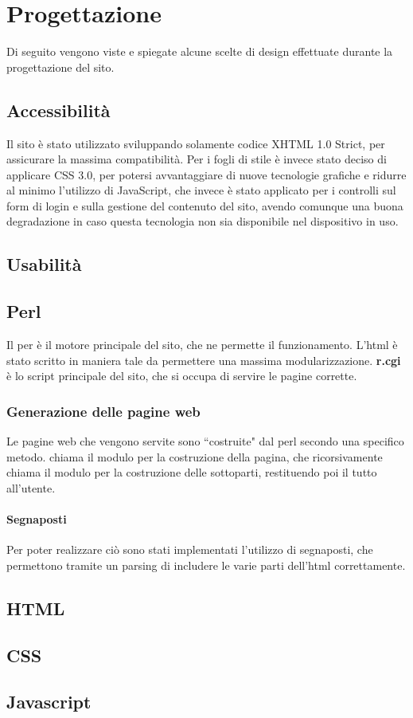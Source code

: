 \section{Progettazione}

Di seguito vengono viste e spiegate alcune scelte di design effettuate durante la progettazione del sito.

\subsection{Accessibilità}
Il sito è stato utilizzato sviluppando solamente codice XHTML 1.0 Strict, per assicurare la massima compatibilità. Per i fogli di stile è invece stato deciso di applicare CSS 3.0, per potersi avvantaggiare di nuove tecnologie grafiche e ridurre al minimo l'utilizzo di JavaScript, che invece è stato applicato per i controlli sul form di login e sulla gestione del contenuto del sito, avendo comunque una buona degradazione in caso questa tecnologia non sia disponibile nel dispositivo in uso.

\subsection{Usabilità}

\subsection{Perl}
Il per \`e il motore principale del sito, che ne permette il funzionamento. L'html \`e stato scritto in maniera tale da permettere una massima modularizzazione. \textbf{r.cgi} \`e lo script principale del sito, che si occupa di servire le pagine corrette.
\subsubsection{Generazione delle pagine web}
Le pagine web che vengono servite sono ``costruite" dal perl secondo una specifico metodo.  chiama il modulo per la costruzione della pagina, che ricorsivamente chiama il modulo per la costruzione delle sottoparti, restituendo poi il tutto all'utente.
\paragraph*{Segnaposti} Per poter realizzare ci\`o sono stati implementati l'utilizzo di segnaposti, che permettono tramite un parsing di includere le varie parti dell'html correttamente.

\subsection{HTML}

\subsection{CSS}

\subsection{Javascript}
